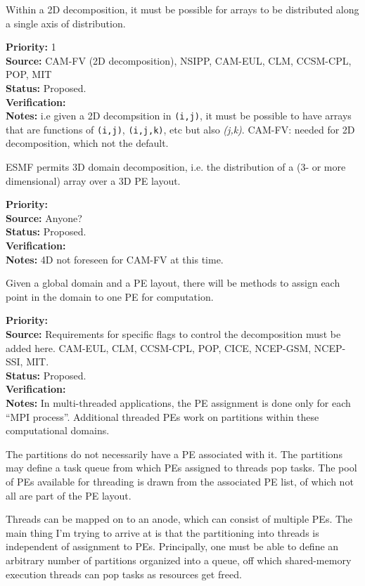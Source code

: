 Within a 2D decomposition, it must be possible for arrays to be
distributed along a single axis of distribution.

\begin{reqlist}
{\bf Priority:} 1 \\ 
{\bf Source:} CAM-FV (2D decomposition), NSIPP, CAM-EUL, CLM, CCSM-CPL, POP, MIT \\
{\bf Status:} Proposed. \\
{\bf Verification:} \\
{\bf Notes:} i.e given a 2D decompsition in \texttt{(i,j)}, it must be
  possible to have arrays that are functions of \texttt{(i,j)},
  \texttt{(i,j,k)}, etc but also \emph{(j,k)}.  CAM-FV: needed for
  2D decomposition, which not the default.
\end{reqlist}


ESMF permits 3D domain decomposition, i.e. the distribution of a
(3- or more dimensional) array over a 3D PE layout.

\begin{reqlist}
{\bf Priority:} \\
{\bf Source:} Anyone? \\
{\bf Status:} Proposed. \\
{\bf Verification:} \\
{\bf Notes:} 4D not foreseen for CAM-FV at this time.
\end{reqlist}


Given a global domain and a PE layout, there will be methods to assign
each point in the domain to one PE for computation. 

\begin{reqlist}
{\bf Priority:} \\ 
{\bf Source:} Requirements for specific flags to control the
  decomposition must be added here. CAM-EUL, CLM, CCSM-CPL, POP, CICE, NCEP-GSM, NCEP-SSI, MIT. \\
{\bf Status:} Proposed. \\
{\bf Verification:} \\
{\bf Notes:} In multi-threaded applications, the PE assignment is done
  only for each ``MPI process''. Additional threaded PEs work on
  partitions within these computational domains.
  
  The partitions do not necessarily have a PE associated with it. The
  partitions may define a task queue from which PEs assigned to
  threads pop tasks. The pool of PEs available for threading is drawn
  from the associated PE list, of which not all are part of the PE
  layout.
  
  Threads can be mapped on to an anode, which can consist of multiple
  PEs.  The main thing I'm trying to arrive at is that the
  partitioning into threads is independent of assignment to PEs.
  Principally, one must be able to define an arbitrary number of
  partitions organized into a queue, off which shared-memory execution
  threads can pop tasks as resources get freed.
\end{reqlist}

